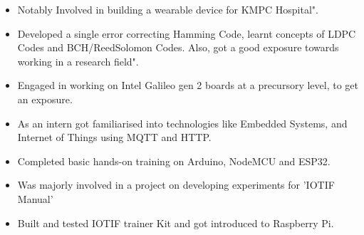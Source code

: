 \documentclass[10pt,a4paper,ragged2e]{altacv}
\begin{document}

\begin{fullwidth}
\makecvheader
\end{fullwidth}


\begin{itemize}
\item Notably Involved in building a wearable device for KMPC Hospital".
\item Developed a single error correcting Hamming Code, learnt concepts of LDPC Codes and BCH/ReedSolomon Codes. Also, got a good exposure towards working in a research field".
\item Engaged in working on Intel Galileo gen 2 boards at a precursory level, to get an exposure.
\end{itemize}

\divider

\begin{itemize}
\item As an intern got familiarised into technologies like Embedded Systems, 
and Internet of Things using MQTT and HTTP.
\item Completed basic hands-on training on Arduino, NodeMCU and ESP32. 
\item Was majorly involved in a project on developing experiments for 'IOTIF Manual'
\item Built and tested IOTIF trainer Kit and got introduced to Raspberry Pi.
\end{itemize}
\end{document}
